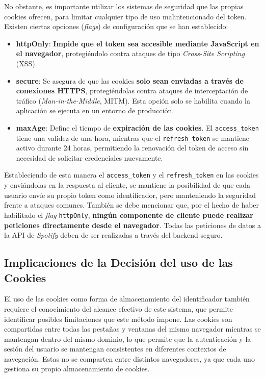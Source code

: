 No obstante, es importante utilizar los sistemas de seguridad que las propias cookies ofrecen, para limitar cualquier tipo de uso malintencionado del token. Existen ciertas opciones (\textit{flags}) de configuración que se han establecido:

\setlength{\itemsep}{0pt}
\begin{itemize}
    \item \textbf{httpOnly}: \textbf{Impide que el token sea accesible mediante JavaScript en el navegador}, protegiéndolo contra ataques de tipo \textit{Cross-Site Scripting} (XSS).
    \item \textbf{secure}: Se asegura de que las cookies \textbf{solo sean enviadas a través de conexiones HTTPS}, protegiéndolas contra ataques de interceptación de tráfico (\textit{Man-in-the-Middle}, MITM). Esta opción solo se habilita cuando la aplicación se ejecuta en un entorno de producción.
    \item \textbf{maxAge}: Define el tiempo de \textbf{expiración de las cookies}. El \texttt{access\_token} tiene una validez de una hora, mientras que el \texttt{refresh\_token} se mantiene activo durante 24 horas, permitiendo la renovación del token de acceso sin necesidad de solicitar credenciales nuevamente.
\end{itemize}

Estableciendo de esta manera el \texttt{access\_token} y el \texttt{refresh\_token} en las cookies y enviándolas en la respuesta al cliente, se mantiene la posibilidad de que cada usuario envíe su propio token como identificador, pero manteniendo la seguridad frente a ataques comunes. También se debe mencionar que, por el hecho de haber habilitado el \textit{flag} \texttt{httpOnly}, \textbf{ningún componente de cliente puede realizar peticiones directamente desde el navegador}. Todas las peticiones de datos a la API de \textit{Spotify} deben de ser realizadas a través del backend seguro.

\subsection*{Implicaciones de la Decisión del uso de las Cookies}

El uso de las cookies como forma de almacenamiento del identificador también requiere el conocimiento del alcance efectivo de este sistema, que permite identificar posibles limitaciones que este método impone. Las cookies son compartidas entre todas las pestañas y ventanas del mismo navegador mientras se mantengan dentro del mismo dominio, lo que permite que la autenticación y la sesión del usuario se mantengan consistentes en diferentes contextos de navegación. Estas no se comparten entre distintos navegadores, ya que cada uno gestiona su propio almacenamiento de cookies.


